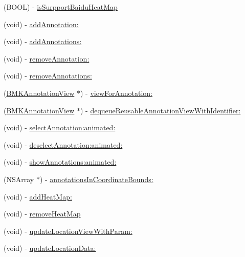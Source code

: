 \begin{DoxyCompactItemize}
\item 
(B\+O\+O\+L) -\/ \hyperlink{interface_b_m_k_map_view_a2256a65857b14f9cd56655663a966e14}{is\+Surpport\+Baidu\+Heat\+Map}
\item 
(void) -\/ \hyperlink{interface_b_m_k_map_view_a2af9ed45c3a7fd530dd414dc573327b3}{add\+Annotation\+:}
\item 
(void) -\/ \hyperlink{interface_b_m_k_map_view_affd032313c55ae27814430b760e4aea0}{add\+Annotations\+:}
\item 
(void) -\/ \hyperlink{interface_b_m_k_map_view_a6b6b75a5bf8b02854767f782a38d2009}{remove\+Annotation\+:}
\item 
(void) -\/ \hyperlink{interface_b_m_k_map_view_a37fbe2b5db750affb4e0234cbf24a3c7}{remove\+Annotations\+:}
\item 
(\hyperlink{interface_b_m_k_annotation_view}{B\+M\+K\+Annotation\+View} $\ast$) -\/ \hyperlink{interface_b_m_k_map_view_a0fb885234188aef28df944d5f636c70c}{view\+For\+Annotation\+:}
\item 
(\hyperlink{interface_b_m_k_annotation_view}{B\+M\+K\+Annotation\+View} $\ast$) -\/ \hyperlink{interface_b_m_k_map_view_a4d4aa7a171876f3f66add8f86cca1e8c}{dequeue\+Reusable\+Annotation\+View\+With\+Identifier\+:}
\item 
(void) -\/ \hyperlink{interface_b_m_k_map_view_a92dbf00c3eff2ede4d4ffd485c4059e0}{select\+Annotation\+:animated\+:}
\item 
(void) -\/ \hyperlink{interface_b_m_k_map_view_a3d6bbc91bc3b66463ee97b3c909e4999}{deselect\+Annotation\+:animated\+:}
\item 
(void) -\/ \hyperlink{interface_b_m_k_map_view_a62093e51bd52b357d909b75b4447b415}{show\+Annotations\+:animated\+:}
\item 
(N\+S\+Array $\ast$) -\/ \hyperlink{interface_b_m_k_map_view_ac683d0d593744c75684063fe8dc9fdcd}{annotations\+In\+Coordinate\+Bounds\+:}
\item 
(void) -\/ \hyperlink{interface_b_m_k_map_view_a5945dec15b2d38ecf4b8efd4ce6b49e2}{add\+Heat\+Map\+:}
\item 
(void) -\/ \hyperlink{interface_b_m_k_map_view_a1337cb03abdb9ae730a2410f0fbd2f2f}{remove\+Heat\+Map}
\item 
(void) -\/ \hyperlink{interface_b_m_k_map_view_afc9842b45a41341b3ea5d2e632344382}{update\+Location\+View\+With\+Param\+:}
\item 
(void) -\/ \hyperlink{interface_b_m_k_map_view_a72c1c3b690379ecf804cc20ddf5840e9}{update\+Location\+Data\+:}
\item 

\end{DoxyCompactItemize}
